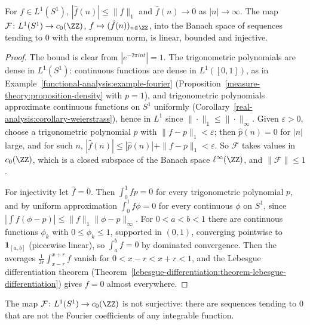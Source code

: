 \begin{proposition}\label{functional-analysis:proposition-riemann-lebesgue}
For $f \in L^1(S^1)$, $|\hat f(n)| \leq \|f\|_1$ and $\hat f(n) \to 0$ as $|n| \to \infty$. The map $\mathcal{F} \colon L^1(S^1) \to c_0(\ZZ)$, $f \mapsto (\hat f(n))_{n \in \ZZ}$, into the Banach space of sequences
tending to $0$ with the supremum norm, is linear, bounded and injective.
\end{proposition}

\begin{proof}
The bound is clear from $|e^{-2\pi int}| = 1$. The trigonometric polynomials are dense in $L^1(S^1)$: continuous functions are dense in $L^1([0, 1])$, as in Example~\ref{functional-analysis:example-fourier}
(Proposition~\ref{measure-theory:proposition-density} with $p = 1$), and trigonometric polynomials approximate continuous functions on $S^1$ uniformly (Corollary~\ref{real-analysis:corollary-weierstrass}), hence
in $L^1$ since $\|\cdot\|_1 \leq \|\cdot\|_\infty$. Given $\varepsilon > 0$, choose a trigonometric polynomial $p$ with $\|f - p\|_1 < \varepsilon$; then $\hat p(n) = 0$ for $|n|$ large, and for such $n$,
$|\hat f(n)| \leq |\hat p(n)| + \|f - p\|_1 < \varepsilon$. So $\mathcal{F}$ takes values in $c_0(\ZZ)$, which is a closed subspace of the Banach space $\ell^\infty(\ZZ)$, and $\|\mathcal{F}\| \leq 1$.

For injectivity let $\hat f = 0$. Then $\int_0^1fp = 0$ for every trigonometric polynomial $p$, and by uniform approximation $\int_0^1f\phi = 0$ for every continuous $\phi$ on $S^1$, since
$|\int f(\phi - p)| \leq \|f\|_1\|\phi - p\|_\infty$. For $0 < a < b < 1$ there are continuous functions $\phi_k$ with $0 \leq \phi_k \leq 1$, supported in $(0, 1)$, converging pointwise to $\mathbf{1}_{[a, b]}$
(piecewise linear), so $\int_a^bf = 0$ by dominated convergence. Then the averages $\frac{1}{2r}\int_{x-r}^{x+r}f$ vanish for $0 < x - r < x + r < 1$, and the Lebesgue differentiation theorem
(Theorem~\ref{lebesgue-differentiation:theorem-lebesgue-differentiation}) gives $f = 0$ almost everywhere.
\end{proof}

\begin{proposition}\label{functional-analysis:proposition-fourier-not-onto}
The map $\mathcal{F} \colon L^1(S^1) \to c_0(\ZZ)$ is not surjective: there are sequences tending to $0$ that are not the Fourier coefficients of any integrable function.
\end{proposition}

